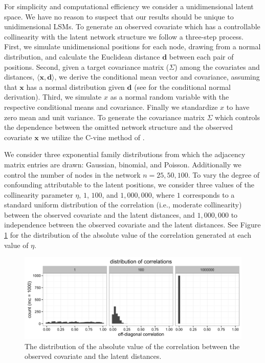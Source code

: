 \documentclass[11pt]{article}
\begin{document}
For simplicity and computational efficiency we consider a unidimensional latent space. We have no reason to suspect that our results should be unique to unidimensional LSMs. To generate an observed covariate which has a controllable collinearity with the latent network structure we follow a three-step process. First, we simulate unidimensional positions for each node, drawing from a normal distribution, and calculate the Euclidean distance $\mathbf{d}$ between each pair of positions. Second, given a target covariance matrix ($\Sigma$) among the covariates and distances, $\langle \mathbf{x}, \mathbf{d} \rangle$, we derive the conditional mean vector and covariance, assuming that $\mathbf{x}$ has a normal distribution given $\mathbf{d}$ (see \cite[pp. 116--117]{eaton1983} for the conditional normal derivation). Third, we simulate $x$ as a normal random variable with the respective conditional means and covariance. Finally we standardize $x$ to have zero mean and unit variance. To generate the covariance matrix $\Sigma$ which controls the dependence between the omitted network structure and the observed covariate $\mathbf{x}$ we utilize the C-vine method of \cite{lewandowski2009generating}. %

We consider three exponential family distributions from which the adjacency matrix entries are drawn: Gaussian, binomial, and Poisson. Additionally we control the number of nodes in the network $n = 25, 50, 100$. To vary the degree of confounding attributable to the latent positions, we consider three values of the collinearity parameter $\eta$, $1$, $100$, and $1,000,000$, where $1$ corresponds to a standard uniform distribution of the correlation  (i.e.,  moderate collinearity) between the observed covariate and the latent distances, and $1,000,000$ to independence between the observed covariate and the latent distances. See Figure \ref{fig:vine} for the distribution of the absolute value of the correlation generated at each value of $\eta$.

\begin{figure}
\includegraphics[width=\textwidth]{figures/max_r_vine.png}
\caption{The distribution of the absolute value of the correlation between the observed covariate and the latent distances. \label{fig:vine}}
\end{figure}
\end{document}
